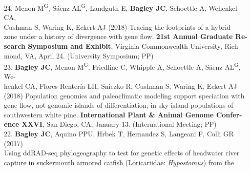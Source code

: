 \documentclass[margin,line]{res}
\begin{document}
\begin{resume}
24. Menon M\textsuperscript{G}, S\'{a}enz AL\textsuperscript{G}, Landguth E, \textbf{Bagley JC}, Schoettle A, Wehenkel CA,\\
\hspace*{8mm} Cushman S, Waring K, Eckert AJ (2018) Tracing the footprints of a hybrid\\
\hspace*{8mm} zone under a history of divergence with gene flow. \textbf{21st Annual Graduate Re-}\\
\hspace*{8mm} \textbf{search Symposium and Exhibit}, Virginia Commonwealth University, Rich-\\ \vspace{2mm}
\hspace*{8mm}mond, VA, April 24. (University Symposium; PP) \\
23. \textbf{Bagley JC}, Menon M\textsuperscript{G}, Friedline C, Whipple A, Schoettle A, S\'{a}enz AL\textsuperscript{G}, We-\\
\hspace*{8mm} henkel CA, Flores-Renter\'{i}a LH, Sniezko R, Cushman S, Waring K, Eckert AJ\\
\hspace*{8mm} (2018) Population genomics and paleoclimatic modeling support speciation with\\
\hspace*{8mm} gene flow, not genomic islands of differentiation, in sky-island populations of\\
\hspace*{8mm} southwestern white pine. \textbf{International Plant \& Animal Genome Confer-}\\ \vspace{2mm}
\hspace*{8mm}\textbf{ence XXVI}, San Diego, CA, January 13. (International Meeting; PP) \\
22. \textbf{Bagley JC}, Aquino PPU, Hrbek T, Hernandez S, Langeani F, Colli GR (2017)\\
\hspace*{8mm} Using ddRAD-seq phylogeography to test for genetic effects of headwater river\\
\hspace*{8mm} capture in suckermouth armored catfish (Loricariidae: \emph{Hypostomus}) from the\\

\end{resume}
\end{document}
